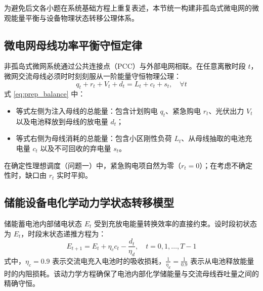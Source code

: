 \documentclass[withoutpreface]{cumcmthesis}
\begin{document}
为避免后文各小题在系统基础方程上重复表述，本节统一构建非孤岛式微电网的微观能量平衡与设备物理状态转移公理体系。

\subsection{微电网母线功率平衡守恒定律}
非孤岛式微网系统通过公共连接点（PCC）与外部电网相联。在任意离散时段 $t$，微网交流母线必须时时刻刻服从一阶能量守恒物理公理：
\begin{equation}
    q_t + r_t + V_t + d_t = L_t + c_t + s_t, \quad \forall t \label{eq:prep_balance}
\end{equation}
式 \eqref{eq:prep_balance} 中：
\begin{itemize}
    \item 等式左侧为注入母线的总能量：包含计划购电 $q_t$、紧急购电 $r_t$、光伏出力 $V_t$ 以及电池释放到母线的放电量 $d_t$；
    \item 等式右侧为母线消耗的总能量：包含小区刚性负荷 $L_t$、从母线抽取的电池充电量 $c_t$ 以及不可回收的弃电量 $s_t$。
\end{itemize}
在确定性理想调度（问题一）中，紧急购电项自然为零（$r_t = 0$）；在考虑不确定性时，缺口由 $r_t$ 实时平抑。

\subsection{储能设备电化学动力学状态转移模型}
储能蓄电池内部储电状态 $E_t$ 受到充放电能量转换效率的直接约束。设时段初状态为 $E_t$，时段末状态递推方程为：
\begin{equation}
    E_{t+1} = E_t + \eta_c c_t - \frac{d_t}{\eta_d}, \quad t = 0, 1, \dots, T-1 \label{eq:prep_soc}
\end{equation}
式中，$\eta_c = 0.9$ 表示交流电充入电池时的吸收损耗，$\frac{1}{\eta_d} = \frac{1}{0.9}$ 表示从电池释放能量时的内阻损耗。该动力学方程确保了电池内部化学储能量与交流母线吞吐量之间的精确守恒。
\end{document}

